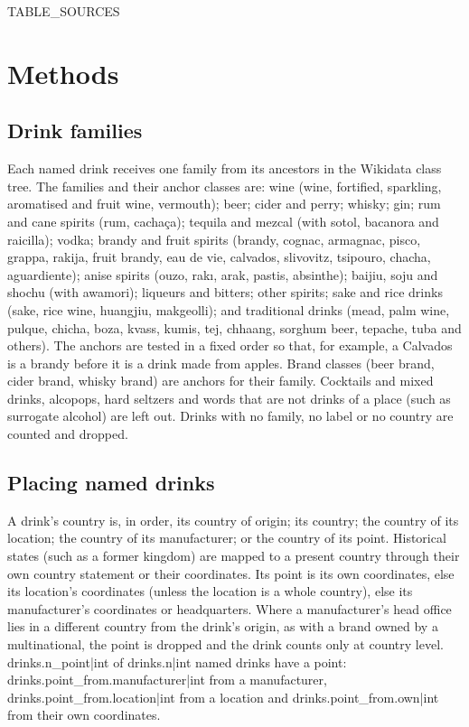 \documentclass[11pt,a4paper]{article}
\begin{document}
{{TABLE_SOURCES}}

\section{Methods}
\subsection{Drink families}
Each named drink receives one family from its ancestors in the Wikidata class tree. The families and their anchor classes are: wine (wine, fortified, sparkling, aromatised and fruit wine, vermouth); beer; cider and perry; whisky; gin; rum and cane spirits (rum, cachaça); tequila and mezcal (with sotol, bacanora and raicilla); vodka; brandy and fruit spirits (brandy, cognac, armagnac, pisco, grappa, rakija, fruit brandy, eau de vie, calvados, slivovitz, tsipouro, chacha, aguardiente); anise spirits (ouzo, rakı, arak, pastis, absinthe); baijiu, soju and shochu (with awamori); liqueurs and bitters; other spirits; sake and rice drinks (sake, rice wine, huangjiu, makgeolli); and traditional drinks (mead, palm wine, pulque, chicha, boza, kvass, kumis, tej, chhaang, sorghum beer, tepache, tuba and others). The anchors are tested in a fixed order so that, for example, a Calvados is a brandy before it is a drink made from apples. Brand classes (beer brand, cider brand, whisky brand) are anchors for their family. Cocktails and mixed drinks, alcopops, hard seltzers and words that are not drinks of a place (such as surrogate alcohol) are left out. Drinks with no family, no label or no country are counted and dropped.

\subsection{Placing named drinks}
A drink's country is, in order, its country of origin; its country; the country of its location; the country of its manufacturer; or the country of its point. Historical states (such as a former kingdom) are mapped to a present country through their own country statement or their coordinates. Its point is its own coordinates, else its location's coordinates (unless the location is a whole country), else its manufacturer's coordinates or headquarters. Where a manufacturer's head office lies in a different country from the drink's origin, as with a brand owned by a multinational, the point is dropped and the drink counts only at country level. {{drinks.n_point|int}} of {{drinks.n|int}} named drinks have a point: {{drinks.point_from.manufacturer|int}} from a manufacturer, {{drinks.point_from.location|int}} from a location and {{drinks.point_from.own|int}} from their own coordinates.
\end{document}
